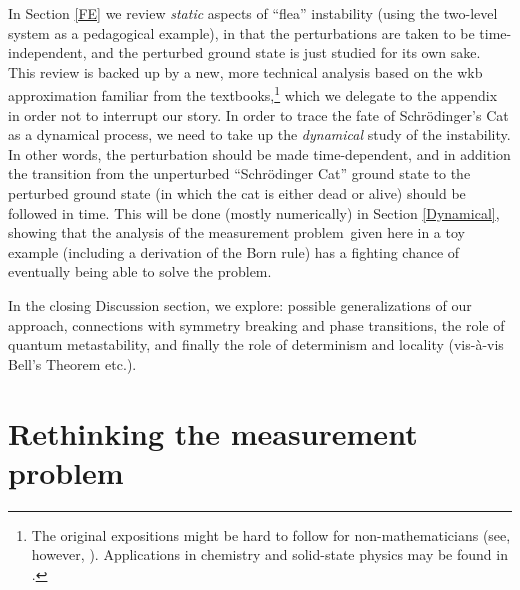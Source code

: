 \documentclass[12pt]{article}
\newcommand{\mmp}{measurement problem}
\begin{document}
In Section \ref{FE} we review \emph{static} aspects of ``flea'' instability (using the two-level system as a pedagogical example), in that the perturbations are taken to be time-independent, and the perturbed ground state is just studied for its own sake. This review is backed up by a new, more technical analysis based  on the  {\sc wkb} approximation familiar from the textbooks,\footnote{The original expositions \cite{CDS2,GGJL,HS,JLMS1,JLMS2,Simon4} might be hard to follow for non-mathematicians (see, however, \cite{CRT}).  Applications in chemistry and solid-state physics may be found in \cite{ClJo86,JLPT,MS1}.} which we delegate to the appendix in order not to interrupt our story. 
In order to trace the fate of Schr\"{o}dinger's Cat as a dynamical process, we need to take up the \emph{dynamical} study of the 
instability. In other words, the perturbation should be made time-dependent, and in addition the transition from the unperturbed ``Schr\"{o}dinger Cat'' ground state to the perturbed ground state (in which the cat is either dead or alive) should be followed in time. This will be done (mostly numerically) in Section \ref{Dynamical}, showing that the analysis of the \mmp\ given here in a toy example  (including a derivation of the Born rule) has a fighting chance of eventually being able to solve the problem.

In the closing Discussion section, we explore: possible generalizations of our approach, 
connections  with  symmetry breaking and phase transitions, the role of quantum metastability, and finally the role of determinism and locality (vis-\`{a}-vis Bell's Theorem etc.).
 \section{Rethinking the \mmp}\label{MP}
\end{document}
